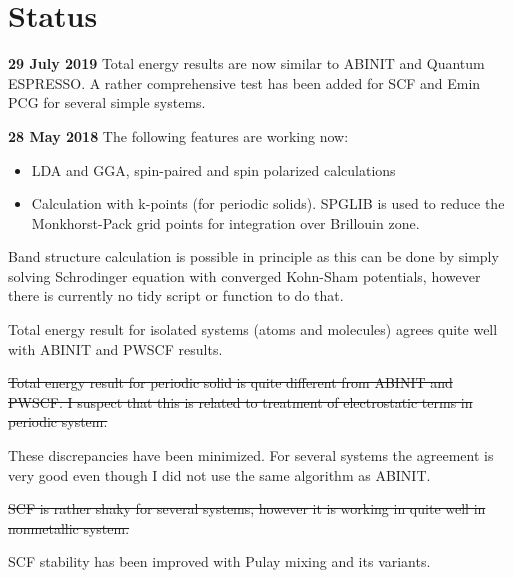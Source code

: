 \documentclass[a4paper,fleqn]{article}
\begin{document}



\section*{Status}

\textbf{29 July 2019} Total energy results are now similar to ABINIT
and Quantum ESPRESSO. A rather comprehensive test has been added
for SCF and Emin PCG for several simple systems.


\textbf{28 May 2018} The following features are working now:
\begin{itemize}
\item LDA and GGA, spin-paired and spin polarized calculations
\item Calculation with k-points (for periodic solids).
  \textsf{SPGLIB} is used to reduce the Monkhorst-Pack grid points
  for integration over Brillouin zone.
\end{itemize}

Band structure calculation is possible in principle as this can be
done by simply solving
Schrodinger equation with converged Kohn-Sham potentials, however there
is currently no tidy script or function to do that.

Total energy result for isolated systems (atoms and molecules) agrees quite
well with ABINIT and PWSCF results.

\sout{Total energy result for periodic solid is quite different from ABINIT and PWSCF.
I suspect that this is related to treatment of electrostatic terms in periodic system.}

These discrepancies have been minimized. For several systems the agreement is very good
even though I did not use the same algorithm as ABINIT.

\sout{SCF is rather shaky for several systems, however it is working in quite well in nonmetallic
system.}

SCF stability has been improved with Pulay mixing and its variants.





\end{document}
